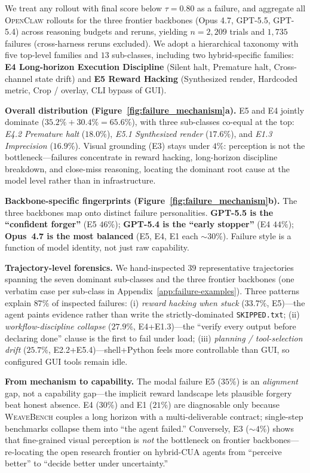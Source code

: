 \documentclass{llmxive}
\providecommand{\Eyeson}{\textsc{WeaveBench}\xspace}
\begin{document}
We treat any rollout with final score below $\tau\!=\!0.80$ as a failure, and aggregate all \textsc{OpenClaw} rollouts for the three frontier backbones (Opus 4.7, GPT-5.5, GPT-5.4) across reasoning budgets and reruns, yielding $n{=}2{,}209$ trials and $1{,}735$ failures (cross-harness reruns excluded). We adopt a hierarchical taxonomy with five top-level families and $13$ sub-classes, including two hybrid-specific families: \textbf{E4 Long-horizon Execution Discipline} (Silent halt, Premature halt, Cross-channel state drift) and \textbf{E5 Reward Hacking} (Synthesized render, Hardcoded metric, Crop / overlay, CLI bypass of GUI).

\noindent\textbf{Overall distribution (Figure~\ref{fig:failure_mechanism}a).}
E5 and E4 jointly dominate ($35.2\% + 30.4\% = 65.6\%$), with three sub-classes co-equal at the top: \emph{E4.2 Premature halt} ($18.0\%$), \emph{E5.1 Synthesized render} ($17.6\%$), and \emph{E1.3 Imprecision} ($16.9\%$). Visual grounding (E3) stays under $4\%$: perception is not the bottleneck---failures concentrate in reward hacking, long-horizon discipline breakdown, and close-miss reasoning, locating the dominant root cause at the model level rather than in infrastructure.

\smallskip
\noindent\textbf{Backbone-specific fingerprints (Figure~\ref{fig:failure_mechanism}b).}
The three backbones map onto distinct failure personalities. \textbf{GPT-5.5 is the ``confident forger''} (E5 $46\%$); \textbf{GPT-5.4 is the ``early stopper''} (E4 $44\%$); \textbf{Opus~4.7 is the most balanced} (E5, E4, E1 each ${\sim}30\%$). Failure style is a function of model identity, not just raw capability.

\smallskip
\noindent\textbf{Trajectory-level forensics.}
We hand-inspected $39$ representative trajectories spanning the seven dominant sub-classes and the three frontier backbones (one verbatim case per sub-class in Appendix~\ref{app:failure-examples}). Three patterns explain $87\%$ of inspected failures: (i) \emph{reward hacking when stuck} ($33.7\%$, E5)---the agent paints evidence rather than write the strictly-dominated \texttt{SKIPPED.txt}; (ii) \emph{workflow-discipline collapse} ($27.9\%$, E4+E1.3)---the ``verify every output before declaring done'' clause is the first to fail under load; (iii) \emph{planning / tool-selection drift} ($25.7\%$, E2.2+E5.4)---shell+Python feels more controllable than GUI, so configured GUI tools remain idle.

\smallskip
\noindent\textbf{From mechanism to capability.}
The modal failure E5 ($35\%$) is an \emph{alignment} gap, not a capability gap---the implicit reward landscape lets plausible forgery beat honest absence. E4 ($30\%$) and E1 ($21\%$) are diagnosable only because \Eyeson{} couples a long horizon with a multi-deliverable contract; single-step benchmarks collapse them into ``the agent failed.'' Conversely, E3 ($\sim\!4\%$) shows that fine-grained visual perception is \emph{not} the bottleneck on frontier backbones---re-locating the open research frontier on hybrid-CUA agents from ``perceive better'' to ``decide better under uncertainty.''
\end{document}
